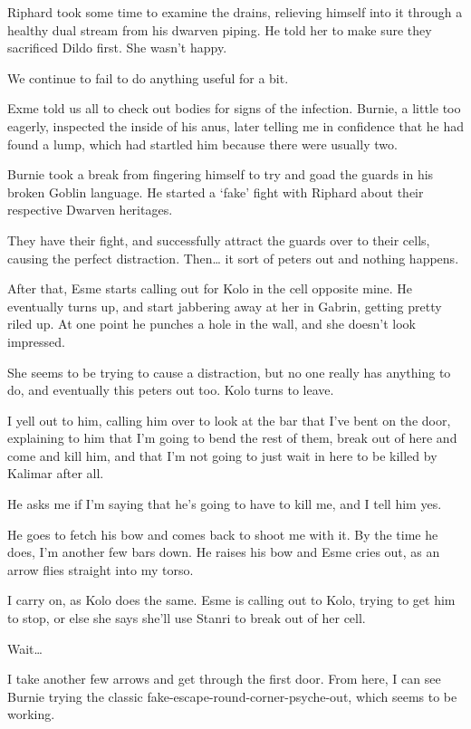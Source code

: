 Riphard took some time to examine the drains, relieving himself into it through a healthy dual stream from his dwarven piping. He told her to make sure they sacrificed Dildo first. She wasn’t happy.\medskip

We continue to fail to do anything useful for a bit.\medskip

Exme told us all to check out bodies for signs of the infection. Burnie, a little too eagerly, inspected the inside of his anus, later telling me in confidence that he had found a lump, which had startled him because there were usually two.\medskip

Burnie took a break from fingering himself to try and goad the guards in his broken Goblin language. He started a ‘fake’ fight with Riphard about their respective Dwarven heritages.\medskip

They have their fight, and successfully attract the guards over to their cells, causing the perfect distraction. Then… it sort of peters out and nothing happens.\medskip

After that, Esme starts calling out for Kolo in the cell opposite mine. He eventually turns up, and start jabbering away at her in Gabrin, getting pretty riled up. At one point he punches a hole in the wall, and she doesn’t look impressed.\medskip

She seems to be trying to cause a distraction, but no one really has anything to do, and eventually this peters out too. Kolo turns to leave.\medskip

I yell out to him, calling him over to look at the bar that I’ve bent on the door, explaining to him that I’m going to bend the rest of them, break out of here and come and kill him, and that I’m not going to just wait in here to be killed by Kalimar after all.\medskip

He asks me if I’m saying that he’s going to have to kill me, and I tell him yes.\medskip

He goes to fetch his bow and comes back to shoot me with it. By the time he does, I’m another few bars down. He raises his bow and Esme cries out, as an arrow flies straight into my torso.\medskip

I carry on, as Kolo does the same. Esme is calling out to Kolo, trying to get him to stop, or else she says she’ll use Stanri to break out of her cell.\medskip

Wait…\medskip

I take another few arrows and get through the first door. From here, I can see Burnie trying the classic fake-escape-round-corner-psyche-out, which seems to be working.\medskip

